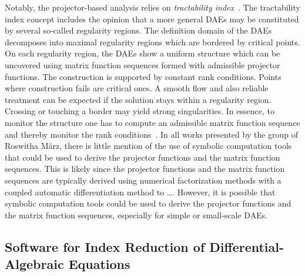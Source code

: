 Notably, the projector-based analysis relies on \emph{tractability index}~\cite{mehrmann2015index}. The tractability index concept includes the opinion that a more general \acp{DAE} may be constituted by several so-called regularity regions. The definition domain of the \acp{DAE} decomposes into maximal regularity regions which are bordered by critical points. On each regularity region, the \acp{DAE} show a uniform structure which can be uncovered using matrix function sequences formed with admissible projector functions. The construction is supported by constant rank conditions. Points where construction fails are critical ones. A smooth flow and also reliable treatment can be expected if the solution stays within a regularity region. Crossing or touching a border may yield strong singularities. In essence, to monitor the structure one has to compute an admissible matrix function sequence and thereby monitor the rank conditions~\cite{lamour2011computational}. In all works presented by the group of Roswitha M\"{a}rz, there is little mention of the use of symbolic computation tools that could be used to derive the projector functions and the matrix function sequences. This is likely since the projector functions and the matrix function sequences are typically derived using numerical factorization methods with a coupled automatic differentiation method to \dots. However, it is possible that symbolic computation tools could be used to derive the projector functions and the matrix function sequences, especially for simple or small-scale \acp{DAE}.

\subsection{Software for Index Reduction of Differential-Algebraic Equations}


